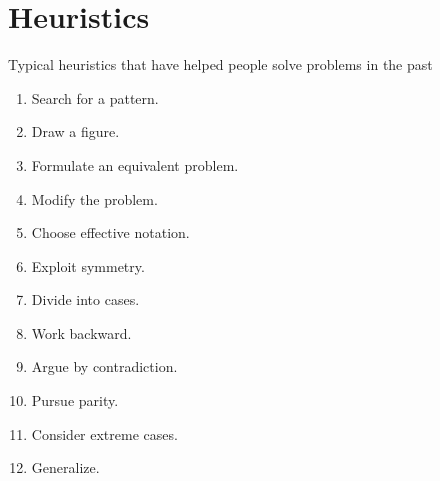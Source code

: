 \chapter{Heuristics}

Typical heuristics that have helped people solve problems in the past
\begin{enumerate}[label=(\arabic*),noitemsep]
\item Search for a pattern.
\item Draw a figure.
\item Formulate an equivalent problem.
\item Modify the problem.
\item Choose effective notation.
\item Exploit symmetry.
\item Divide into cases.
\item Work backward.
\item Argue by contradiction.
\item Pursue parity.
\item Consider extreme cases.
\item Generalize.
\end{enumerate}
